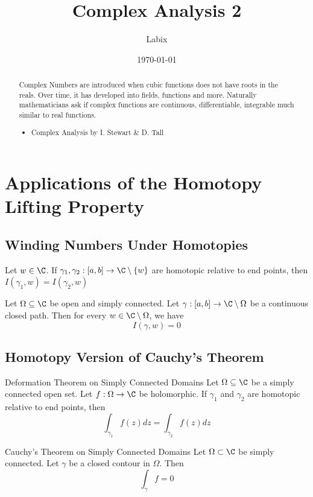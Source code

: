 \documentclass[a4paper]{article}
\title{Complex Analysis 2}
\author{Labix}
\date{\today}
\begin{document}
\maketitle
\begin{abstract}
Complex Numbers are  introduced when cubic functions does not have roots in the reals. Over time, it has developed into fields, functions and more. Naturally mathematicians ask if complex functions are continuous, differentiable, integrable much similar to real functions. \\
\begin{itemize}
\item Complex Analysis by I. Stewart \& D. Tall
\end{itemize}
\end{abstract}
\tableofcontents
\pagebreak

\section{Applications of the Homotopy Lifting Property}
\subsection{Winding Numbers Under Homotopies}
\begin{thm}{}{} Let $w\in\C$. If $\gamma_1,\gamma_2:[a,b]\to\C\setminus\{w\}$ are homotopic relative to end points, then $I(\gamma_1,w)=I(\gamma_2,w)$
\end{thm}

\begin{crl}{}{} Let $\Omega\subseteq\C$ be open and simply connected. Let $\gamma:[a,b]\to\C\setminus\Omega$ be a continuous closed path. Then for every $w\in\C\setminus\Omega$, we have $$I(\gamma,w)=0$$
\end{crl}

\subsection{Homotopy Version of Cauchy's Theorem}
\begin{thm}{Deformation Theorem on Simply Connected Domains}{} Let $\Omega\subseteq\C$ be a simply connected open set. Let $f:\Omega\to\C$ be holomorphic. If $\gamma_1$ and $\gamma_2$ are homotopic relative to end points, then $$\int_{\gamma_1}f(z)dz=\int_{\gamma_2}f(z)dz$$
\end{thm}

\begin{thm}{Cauchy's Theorem on Simply Connected Domains}{} Let $\Omega\subset\C$ be simply connected. Let $\gamma$ be a closed contour in $\Omega$. Then $$\int_{\gamma}f=0$$
\end{thm}
\end{document}
